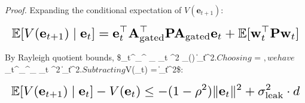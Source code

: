 \documentclass[10pt,twocolumn,letterpaper]{article}
\begin{document}
\textit{Proof.} Expanding the conditional expectation of $V(\mathbf{e}_{t+1})$:





















\begin{equation}
\resizebox{\columnwidth}{!}{$\displaystyle
\begin{aligned}
\mathbb{E}[V(\mathbf{e}_{t+1}) \mid \mathbf{e}_t] = \mathbf{e}_t^\top \mathbf{A}_{\text{gated}}^\top \mathbf{P} \mathbf{A}_{\text{gated}} \mathbf{e}_t + \mathbb{E}[\mathbf{w}_t^\top \mathbf{P} \mathbf{w}_t]
\end{aligned}
$}
\end{equation}





















By Rayleigh quotient bounds, \$\_t^\top {}\_{}^\top {} \_{} \_t \le \rho^2 \lambda\_{\max}() \|\_t\|^2$. Choosing $ = $, we have $\_t^\top {}\_{}^\top {}\_{} \_t \le \rho^2 \|\_t\|^2$. Subtracting $V(\_t) = \|\_t\|^2\$:





















\begin{equation}
\resizebox{\columnwidth}{!}{$\displaystyle
\begin{aligned}
\mathbb{E}[V(\mathbf{e}_{t+1}) \mid \mathbf{e}_t] - V(\mathbf{e}_t) \le -(1 - \rho^2) \|\mathbf{e}_t\|^2 + \sigma_{\text{leak}}^2 \cdot d
\end{aligned}
$}
\end{equation}
\end{document}
